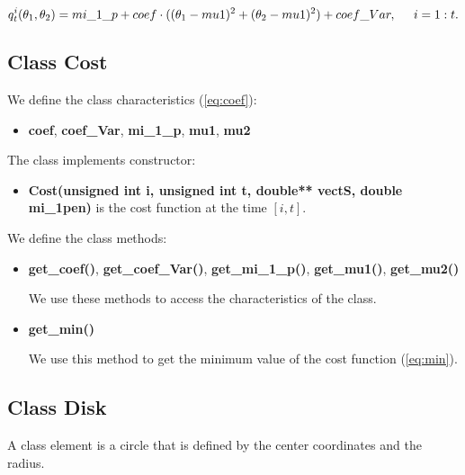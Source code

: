 \documentclass{report}
\begin{document}
		\begin{equation}
	q_t^i(\theta_1,\theta_2) = mi\_1\_p+ coef\cdot((\theta_1 - mu1)^2 + (\theta_2 -mu1)^2) + coef\_Var, \hspace*{5mm} i = 1:t.
	\label{eq:costcoef}
	\end{equation}
	
	\subsection*{Class  Cost}
	\label{Cost}
	
	We define the class characteristics (\ref{eq:coef}): 
	
	\begin{itemize}
		\item {\bfseries coef}, {\bfseries coef\_Var}, {\bfseries mi\_1\_p}, {\bfseries mu1}, {\bfseries mu2} 
	\end{itemize}
 
	The class implements constructor:
	\begin{itemize}
		
		\item {\bfseries Cost(unsigned int i, unsigned int t, double** vectS, double mi\_1pen)} is the cost function at the time $[i,t]$. 
	\end{itemize}
	
	We define the class methods:
	
	\begin{itemize}
		\item {\bfseries get\_coef()}, {\bfseries get\_coef\_Var()}, {\bfseries get\_mi\_1\_p()}, {\bfseries get\_mu1()}, {\bfseries get\_mu2()}
		
		We use these  methods to access the characteristics of the class. 
		
		\item {\bfseries get\_min()}
		
		We use this method to get the minimum value of the cost function (\ref{eq:min}).
	\end{itemize} 

\newpage	

	\subsection*{Class Disk}
	\label{Disk}
	
	A class element is a circle that is defined by the center coordinates and the radius.
	
\end{document}
